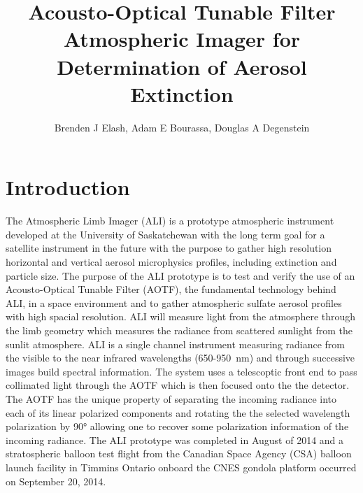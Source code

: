 \documentclass[12pt]{article}
\title{Acousto-Optical Tunable Filter Atmospheric Imager for Determination of Aerosol Extinction}
\author{Brenden J Elash, Adam E Bourassa, Douglas A Degenstein}
\begin{document}
\renewcommand\bibname{BiBTex.bib}

\maketitle

\section{Introduction}

The Atmospheric Limb Imager (ALI) is a prototype atmospheric instrument developed at the University of Saskatchewan with the long term goal for a satellite instrument in the future with the purpose to gather high resolution horizontal and vertical aerosol microphysics profiles, including extinction and particle size. The purpose of the ALI prototype is to test and verify the use of an Acousto-Optical Tunable Filter (AOTF), the fundamental technology behind ALI, in a space environment and to gather atmospheric sulfate aerosol profiles with high spacial resolution. ALI will measure light from the atmosphere through the limb geometry which measures the radiance from scattered sunlight from the sunlit atmosphere. ALI is a single channel instrument measuring radiance from the visible to the near infrared wavelengths (650-950~nm) and through successive images build spectral information. The system uses a telescoptic front end to pass collimated light through the AOTF which is then focused onto the the detector. The AOTF has the unique property of separating the incoming radiance into each of its linear polarized components and rotating the the selected wavelength polarization by 90\si{\degree} allowing one to recover some polarization information of the incoming radiance. The ALI prototype was completed in August of 2014 and a stratospheric balloon test flight from the Canadian Space Agency (CSA) balloon launch facility in Timmins Ontario onboard the CNES gondola platform occurred on September 20, 2014.
\end{document}
